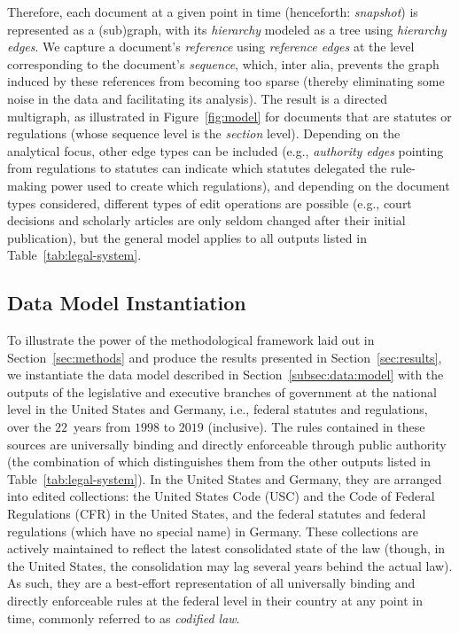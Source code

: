 \documentclass[utf8,sort&compress,table,hidelinks]{frontiersFPHY} %
\begin{document}
Therefore, each document at a given point in time (henceforth: \emph{snapshot}) is represented as a (sub)graph, with its \emph{hierarchy} modeled as a tree using \emph{hierarchy edges}.
We capture a document's \emph{reference} using \emph{reference edges} at the level corresponding to the document's \emph{sequence}, which, inter alia, prevents the graph induced by these references from becoming too sparse (thereby eliminating some noise in the data and facilitating its analysis).
The result is a directed multigraph, as illustrated in Figure~\ref{fig:model} for documents that are statutes or regulations (whose sequence level is the \emph{section} level). 
Depending on the analytical focus, other edge types can be included (e.g., \emph{authority edges} pointing from regulations to statutes can indicate which statutes delegated the rule-making power used to create which regulations), 
and depending on the document types considered, different types of edit operations are possible (e.g., court decisions and scholarly articles are only seldom changed after their initial publication), 
but the general model applies to all outputs listed in Table~\ref{tab:legal-system}.



\vspace*{6pt}
\subsection{Data Model Instantiation}\label{subsec:data:instance}
To illustrate the power of the methodological framework laid out in Section~\ref{sec:methods} and produce the results presented in Section~\ref{sec:results}, we instantiate the data model described in Section~\ref{subsec:data:model} with the outputs of the legislative and executive branches of government at the national level in the United States and Germany, i.e., federal statutes and regulations, over the $22$~years from $1998$ to $2019$ (inclusive).
The rules contained in these sources are universally binding and directly enforceable through public authority (the combination of which distinguishes them from the other outputs listed in Table~\ref{tab:legal-system}).
In the United States and Germany, they are arranged into edited collections: the United States Code (USC) and the Code of Federal Regulations (CFR) in the United States, and the federal statutes and federal regulations (which have no special name) in Germany.
These collections are actively maintained to reflect the latest consolidated state of the law (though, in the United States, the consolidation may lag several years behind the actual law).
As such, they are a best-effort representation of all universally binding and directly enforceable rules at the federal level in their country at any point in time, commonly referred to as \emph{codified law}.
\end{document}
